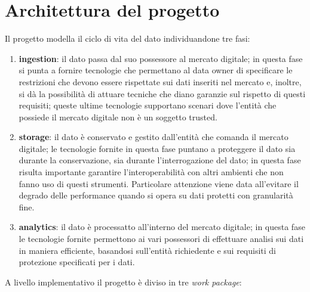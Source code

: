 \documentclass[12pt,a4paper,twoside]{book}
\begin{document}
\section{Architettura del progetto}
Il progetto modella il ciclo di vita del dato individuandone tre fasi:
\begin{enumerate}
\item \textbf{ingestion}: il dato passa dal suo possessore al mercato digitale; in questa fase si punta a fornire tecnologie che permettano al data owner di specificare le restrizioni che devono essere rispettate sui dati inseriti nel mercato e, inoltre, si dà la possibilità di attuare tecniche che diano garanzie sul rispetto di questi requisiti; queste ultime tecnologie supportano scenari dove l'entità che possiede il mercato digitale non è un soggetto trusted.
\item \textbf{storage}: il dato è conservato e gestito dall'entità che comanda il mercato digitale; le tecnologie fornite in questa fase puntano a proteggere il dato sia durante la conservazione, sia durante l'interrogazione del dato; in questa fase risulta importante garantire l'interoperabilità con altri ambienti che non fanno uso di questi strumenti. Particolare attenzione viene data all'evitare il degrado delle performance quando si opera su dati protetti con granularità fine.
\item \textbf{analytics}: il dato è processatto all'interno del mercato digitale; in questa fase le tecnologie fornite permettono ai vari possessori di effettuare analisi sui dati in maniera efficiente, basandosi sull'entità richiedente e sui requisiti di protezione specificati per i dati.
\end{enumerate}
A livello implementativo il progetto è diviso in tre \textit{work package}:
\end{document}
